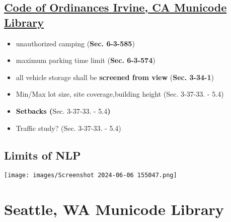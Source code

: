 \documentclass[
  letterpaper,
  DIV=11,
  numbers=noendperiod]{scrartcl}
\begin{document}
\hypertarget{code-of-ordinances-irvine-ca-municode-library}{%
\subsection{\texorpdfstring{\href{https://library.municode.com/ca/irvine/codes/code_of_ordinances?nodeId=TIT2ADSE_DIV10SPPELI_CH11ICCRVE_S2-10-1113SIRE}{Code
of Ordinances \textbar{} Irvine, CA \textbar{} Municode
Library}}{Code of Ordinances \textbar{} Irvine, CA \textbar{} Municode Library}}\label{code-of-ordinances-irvine-ca-municode-library}}

\begin{itemize}
\item
  unauthorized camping (\textbf{Sec. 6-3-585})
\item
  maximum parking time limit (\textbf{Sec. 6-3-574})
\item
  all vehicle storage shall be \textbf{screened from view} (\textbf{Sec.
  3-34-1})
\item
  Min/Max lot size, site coverage,building height (Sec. 3-37-33. - 5.4)
\item
  \textbf{Setbacks (}Sec. 3-37-33. - 5.4\textbf{)}
\item
  Traffic study? (Sec. 3-37-33. - 5.4)
\end{itemize}

\hypertarget{limits-of-nlp}{%
\subsection{\texorpdfstring{\textbf{Limits of
NLP}}{Limits of NLP}}\label{limits-of-nlp}}

\texttt{[image: images/Screenshot 2024-06-06 155047.png]}

\hypertarget{seattle-wa-municode-library}{%
\section{Seattle, WA \textbar{} Municode
Library}\label{seattle-wa-municode-library}}
\end{document}
